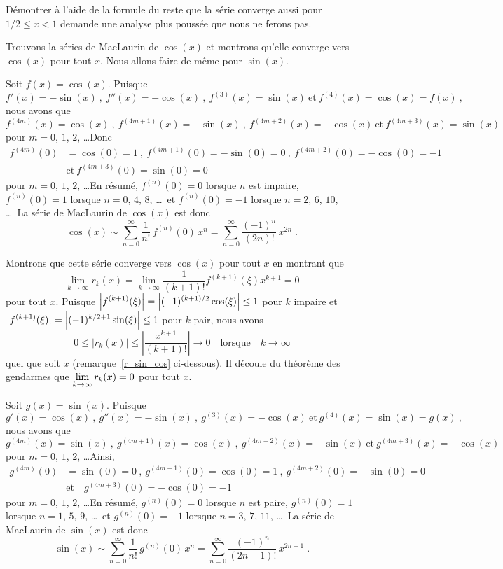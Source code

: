 {\begin{egg}
Démontrer à l'aide de la formule du reste que la série converge aussi pour
$1/2 \leq x <1$ demande une analyse plus poussée que nous ne ferons pas.
\end{egg}

\begin{egg}
Trouvons la séries de MacLaurin de $\cos(x)$ et montrons qu'elle
converge vers $\cos(x)$ pour tout $x$.  Nous allons faire de même pour
$\sin(x)$.

 Soit $f(x) = \cos(x)$.  Puisque
\[
f'(x) = -\sin(x) \ , \ f''(x) = -\cos(x) \ , \ f^{(3)}(x) =
\sin(x) \ \text{et} \ f^{(4)}(x) = \cos(x) = f(x) \ ,
\]
nous avons que
\[
f^{(4m)}(x) = \cos(x) \ , \ f^{(4m+1)}(x) = -\sin(x) \ , \ 
f^{(4m+2)}(x) = -\cos(x) \ \text{et} \ f^{(4m+3)}(x) = \sin(x)
\]
pour $m=0$, $1$, $2$, \ldots\quad  Donc
\begin{align*}
f^{(4m)}(0) &= \cos(0) = 1 \ , \ f^{(4m+1)}(0) = -\sin(0) = 0 \ , \ 
f^{(4m+2)}(0) = -\cos(0) = -1 \\
&\text{et} \ f^{(4m+3)}(0) = \sin(0) = 0
\end{align*}
pour $m=0$, $1$, $2$, \ldots\quad  En résumé, $f^{(n)}(0) = 0$ lorsque $n$ est
impaire, $f^{(n)}(0) = 1$ lorsque $n=0$, $4$, $8$, \ldots \  et
$f^{(n)}(0) = -1$ lorsque $n=2$, $6$, $10$, \ldots \  La série de MacLaurin
de $\cos(x)$ est donc
\[
\cos(x) \sim \sum_{n=0}^\infty \frac{1}{n!}\,f^{(n)}(0) \, x^n
= \sum_{n=0}^\infty \frac{(-1)^n}{(2n)!} \, x^{2n} \; .
\]

Montrons que cette série converge vers $\cos(x)$ pour tout $x$ en
montrant que
\[
\lim_{k\rightarrow \infty} r_k(x) =
\lim_{k\rightarrow \infty}
\frac{1}{(k+1)!} f^{(k+1)}(\xi) x^{k+1} = 0
\]
pour tout $x$.  Puisque
$\displaystyle \left| f^{(k+1)}(\xi) \right|
= \left| (-1)^{(k+1)/2} \cos(\xi) \right| \leq 1$ pour $k$ impaire et
$\displaystyle \left| f^{(k+1)}(\xi) \right|
= \left| (-1)^{k/2+1} \sin(\xi) \right| \leq 1$ pour $k$ pair, nous avons
\[
0 \leq \left| r_k(x) \right| \leq \left| \frac{x^{k+1}}{(k+1)!} \right|
\rightarrow 0 \quad \text{lorsque} \quad k \rightarrow \infty
\]
quel que soit $x$ (remarque~\ref{r_sin_cos} ci-dessous).  Il
découle du théorème des gendarmes que
$\displaystyle \lim_{k\rightarrow \infty} r_k(x) = 0$ pour tout $x$.

 Soit $g(x) = \sin(x)$.  Puisque
\[
g'(x) = \cos(x) \ , \ g''(x) = -\sin(x) \ , \ g^{(3)}(x) = -\cos(x) \ 
\text{et} \ g^{(4)}(x) = \sin(x) = g(x) \ , 
\]
nous avons que
\[
g^{(4m)}(x) = \sin(x) \ , \ g^{(4m+1)}(x) = \cos(x) \ , \ g^{(4m+2)}(x) =
-\sin(x) \ \text{et} \ g^{(4m+3)}(x) = -\cos(x)
\]
pour $m=0$, $1$, $2$, \ldots\quad  Ainsi,
\begin{align*}
g^{(4m)}(0) &= \sin(0) = 0 \ , \ g^{(4m+1)}(0) = \cos(0) = 1 \ , \ 
g^{(4m+2)}(0) = -\sin(0) = 0 \\ 
&\text{et} \quad
g^{(4m+3)}(0) = -\cos(0) = -1
\end{align*}
pour $m=0$, $1$, $2$, \ldots\quad  En résumé, $g^{(n)}(0) = 0$ lorsque $n$ est
paire, $g^{(n)}(0) = 1$ lorsque $n=1$, $5$, $9$, \ldots \ et
$g^{(n)}(0) = -1$ lorsque $n=3$, $7$, $11$, \ldots \  La série de MacLaurin
de $\sin(x)$ est donc
\[
\sin(x) \sim \sum_{n=0}^\infty \frac{1}{n!}\,g^{(n)}(0) \, x^n
= \sum_{n=0}^\infty \frac{(-1)^n}{(2n+1)!}\, x^{2n+1} \; .
\]


\end{egg}}
